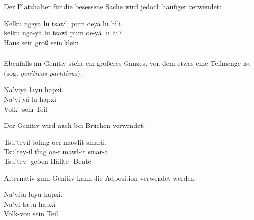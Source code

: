 \noindent Der Platzhalter  für die besessene Sache wird jedoch häufiger verwendet:\label{syn:pum:genitive}

\begin{interlin}
	\glll \Npawl{}Kelku ngeyä lu tsawl; pum oeyä lu hì'i. \\
	kelku nga-yä lu tsawl pum oe-yä lu hì'i \\
	Haus  sein groß   sein klein \\
\end{interlin}

\subsubsection{} Ebenfalls im Genitiv steht ein größeres Ganzes, von dem etwas eine Teilmenge ist (sog. \textit{genitivus partitivus}):

\begin{interlin}\label{gen:partitive:ex01}
	\glll \Nfilm{}Na'viyä luyu hapxì. \\
	Na'vi-yä lu hapxì \\
	Volk- sein Teil \\
\end{interlin}

\pagebreak
\noindent Der Genitiv wird auch bei Brüchen verwendet:

\begin{interlin}
	\glll \Npawl{}Tsu'teyìl tolìng oer mawlit smarä. \\
	Tsu'tey-ìl tìng oe-r mawl-it smar-ä \\
	Tsu'tey- geben  Hälfte- Beute- \\
\end{interlin}

\noindent Alternativ zum Genitiv kann die Adposition  verwendet werden: 

\begin{interlin}
	\glll \Npawl{}Na'vita luyu hapxì. \\
	Na'vi-ta lu hapxì \\
	Volk-von sein Teil \\
\end{interlin}

